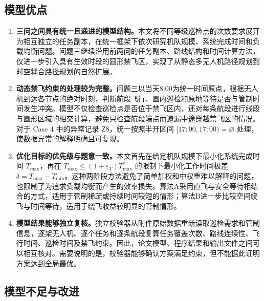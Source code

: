 \documentclass[UTF8,a4paper,12pt]{ctexart}
\numberwithin{equation}{section}
\numberwithin{equation}{section}
\begin{document}
\subsection{模型优点}

\begin{enumerate}[label=（\arabic*）]
  \item \textbf{三问之间具有统一且递进的模型结构。}本文将不同等级巡检点的次数要求展开为相互独立的任务副本，在统一框架下依次研究机队规模、系统完成时间和负载均衡问题。问题三继续沿用前两问的任务副本、路线结构和时间计算方法，仅进一步引入具有生效时段的圆形禁飞区，实现了从静态多无人机路径规划到时空耦合路径规划的自然扩展。

  \item \textbf{动态禁飞约束的处理较为完整。}问题三以当天8:00为统一时间原点，根据无人机到达各节点的绝对时刻，判断航段飞行、圆内巡检和原地等待是否与管制时间发生冲突。模型不仅检查巡检点是否位于禁飞区内，还对每条航段进行线段与圆形区域的相交计算，避免只检查航段端点而遗漏中途穿越禁飞区的情况。对于 Case 4 中的异常记录 Z8，统一按照半开区间 $[17{:}00,17{:}00)=\varnothing$ 处理，使数据异常的解释明确且可复现。

  \item \textbf{优化目标的优先级与题意一致。}本文首先在给定机队规模下最小化系统完成时间 $T_{\max}$，再在 $T_{\max}\leq(1+\varepsilon_T)T_{\max}^{*}$ 的限制下最小化工作时间极差 $\delta=T_{\max}-T_{\min}$。这种两阶段方法避免了简单加权和中权重难以解释的问题，也限制了为追求负载均衡而产生的效率损失。算法A采用直飞与安全等待相结合的方式，适用于管制稀疏或持续时间较短的情形；算法B进一步比较空间绕飞与时间等待，适用于绕飞收益较明显的管制情形。

  \item \textbf{模型结果能够独立复核。}独立校验器从附件原始数据重新读取巡检需求和管制信息，逐架无人机、逐个任务和逐条航段复算任务覆盖次数、路线连续性、飞行时间、巡检时间及禁飞约束。因此，论文模型、程序结果和输出文件之间可以相互核对。需要说明的是，校验器能够确认方案满足约束，但不能据此证明方案达到全局最优。
\end{enumerate}

\subsection{模型不足与改进}
\end{document}
